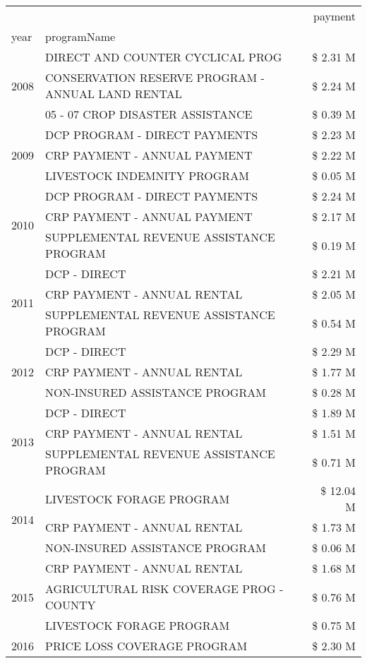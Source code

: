 \begin{tabular}{llr}
\toprule
 &  & payment \\
year & programName &  \\
\midrule
\multirow[t]{3}{*}{2008} & DIRECT AND COUNTER CYCLICAL PROG & \$ 2.31 M \\
 & CONSERVATION RESERVE PROGRAM - ANNUAL LAND RENTAL & \$ 2.24 M \\
 & 05 - 07 CROP DISASTER ASSISTANCE & \$ 0.39 M \\
\cline{1-3}
\multirow[t]{3}{*}{2009} & DCP PROGRAM - DIRECT PAYMENTS & \$ 2.23 M \\
 & CRP PAYMENT - ANNUAL PAYMENT & \$ 2.22 M \\
 & LIVESTOCK INDEMNITY PROGRAM & \$ 0.05 M \\
\cline{1-3}
\multirow[t]{3}{*}{2010} & DCP PROGRAM - DIRECT PAYMENTS & \$ 2.24 M \\
 & CRP PAYMENT - ANNUAL PAYMENT & \$ 2.17 M \\
 & SUPPLEMENTAL REVENUE ASSISTANCE PROGRAM & \$ 0.19 M \\
\cline{1-3}
\multirow[t]{3}{*}{2011} & DCP - DIRECT & \$ 2.21 M \\
 & CRP PAYMENT - ANNUAL RENTAL & \$ 2.05 M \\
 & SUPPLEMENTAL REVENUE ASSISTANCE PROGRAM & \$ 0.54 M \\
\cline{1-3}
\multirow[t]{3}{*}{2012} & DCP - DIRECT & \$ 2.29 M \\
 & CRP PAYMENT - ANNUAL RENTAL & \$ 1.77 M \\
 & NON-INSURED ASSISTANCE PROGRAM & \$ 0.28 M \\
\cline{1-3}
\multirow[t]{3}{*}{2013} & DCP - DIRECT & \$ 1.89 M \\
 & CRP PAYMENT - ANNUAL RENTAL & \$ 1.51 M \\
 & SUPPLEMENTAL REVENUE ASSISTANCE PROGRAM & \$ 0.71 M \\
\cline{1-3}
\multirow[t]{3}{*}{2014} & LIVESTOCK FORAGE PROGRAM & \$ 12.04 M \\
 & CRP PAYMENT - ANNUAL RENTAL & \$ 1.73 M \\
 & NON-INSURED ASSISTANCE PROGRAM & \$ 0.06 M \\
\cline{1-3}
\multirow[t]{3}{*}{2015} & CRP PAYMENT - ANNUAL RENTAL & \$ 1.68 M \\
 & AGRICULTURAL RISK COVERAGE PROG - COUNTY & \$ 0.76 M \\
 & LIVESTOCK FORAGE PROGRAM & \$ 0.75 M \\
\cline{1-3}
\multirow[t]{3}{*}{2016} & PRICE LOSS COVERAGE PROGRAM & \$ 2.30 M \\

\end{tabular}
